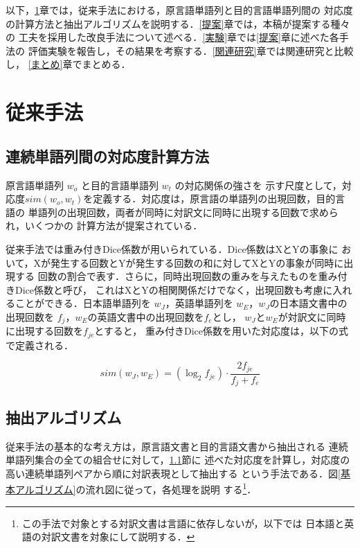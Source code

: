 以下，\ref{従来}章では，従来手法\cite{北村97}における，原言語単語列と目的言語単語列間の
対応度の計算方法と抽出アルゴリズムを説明する．\ref{提案}章では，本稿が提案する種々の
工夫を採用した改良手法について述べる．\ref{実験}章では\ref{提案}章に述べた各手法の
評価実験を報告し，その結果を考察する．\ref{関連研究}章では関連研究と比較し，
\ref{まとめ}章でまとめる．

\section{従来手法}
\label{従来}

\subsection{連続単語列間の対応度計算方法}
\label{連続単語列間の対応度計算方法}

原言語単語列 $ w_{o} $ と目的言語単語列 $ w_{t} $ の対応関係の強さを
示す尺度として，対応度$sim(w_{o},w_{t})$を定義する．対応度は，原言語の単語列の出現回数，目的言語の
単語列の出現回数，両者が同時に対訳文に同時に出現する回数で求められ，いくつかの
計算方法が提案されている\cite{Matsumoto-Utsuro:2000}．

従来手法では重み付きDice係数が用いられている．Dice係数はXとYの事象に
おいて，Xが発生する回数とYが発生する回数の和に対してXとYの事象が同時に出現する
回数の割合で表す．さらに，同時出現回数の重みを与えたものを重み付きDice係数と呼び，
これはXとYの相関関係だけでなく，出現回数も考慮に入れることができる．日本語単語列を
$ w_{J} $，英語単語列を $ w_{E} $，$ w_{J} $の日本語文書中の出現回数を
$ f_{j} $，$ w_{E} $の英語文書中の出現回数を$ f_{e} $とし，
$ w_{J} $と$ w_{E} $が対訳文に同時に出現する回数を$ f_{je} $とすると，
重み付きDice係数を用いた対応度は，以下の式で定義される\cite{北村97}．
  
\[ sim(w_{J},w_{E})=(\log_{2}f_{je}) \cdot \frac{2f_{je}}{f_{j}+f_{e}}  \]

\subsection{抽出アルゴリズム}
\label{抽出アルゴリズム}

従来手法の基本的な考え方は，原言語文書と目的言語文書から抽出される
連続単語列集合の全ての組合せに対して，\ref{連続単語列間の対応度計算方法}節に
述べた対応度を計算し，対応度の高い連続単語列ペアから順に対訳表現として抽出する
という手法である．図\ref{基本アルゴリズム}の流れ図に従って，各処理を説明
する\footnote{この手法で対象とする対訳文書は言語に依存しないが，以下では
日本語と英語の対訳文書を対象にして説明する．}．


